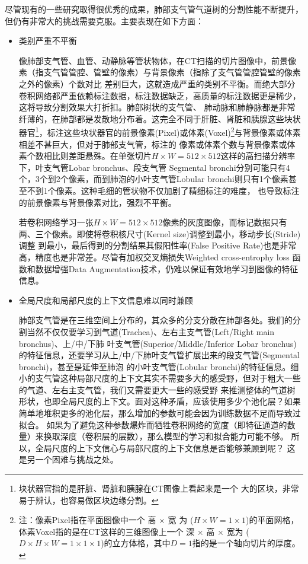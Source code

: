 尽管现有的一些研究取得很优秀的成果，肺部支气管气道树的分割性能不断提升，但仍有非常大的挑战需要克服。主要表现在如下方面：
\begin{itemize}
	\item {\heiti 类别严重不平衡}
	
	像肺部支气管、血管、动静脉等管状物体，在CT扫描的切片图像中，前景像素（指支气管管腔、管壁的像素）与背景像素（指除了支气管管腔管壁的像素之外的像素）个数对比
	差别巨大，这就造成严重的类别不平衡。而绝大部分卷积网络都严重依赖标注数据，标注数据缺乏，高质量的标注数据更是稀少，这将导致分割效果大打折扣。肺部树状的支气管、
	肺动脉和肺静脉都是非常纤薄的，在肺部都是发散地分布着。这完全不同于肝脏、肾脏和胰腺这些块状器官\footnote{块状器官指的是肝脏、肾脏和胰腺在CT图像上看起来是一个
	大的区块，非常易于辨认，也容易做区块边缘分割。}，标注这些块状器官的前景像素(Pixel)或体素(Voxel)\footnote{注：像素Pixel指在平面图像中一个 高 $\times$ 宽 为
	($H \times W = 1 \times 1$)的平面网格，体素Voxel指的是在CT这样的三维图像上一个 深 $\times$ 高 $\times$ 宽为
	($D \times H \times W = 1 \times 1 \times 1$)的立方体格，其中$D = 1$指的是一个轴向切片的厚度。}与背景像素或体素相差不甚巨大，但对于肺部支气管，标注的
	像素或体素个数与背景像素或体素个数相比则差距悬殊。在单张切片$H \times W = 512 \times 512$这样的高扫描分辨率下，叶支气管Lobar bronchus、段支气管
	Segmental bronchi分别可能只有4个，3个到2个像素，而到肺泡的小叶支气管Lobular bronchi则只有1个像素甚至不到1个像素。这种毛细的管状物不仅加剧了精细标注的难度，
	也导致标注的前景像素与背景像素对比，强烈不平衡。
	
	若卷积网络学习一张$H \times W = 512 \times 512$像素的灰度图像，而标记数据只有两、三个像素。即使将卷积核尺寸(Kernel size)调整到最小，移动步长(Stride)调整
	到最小，最后得到的分割结果其假阳性率(False Positive Rate)也是非常高，精度也是非常差。尽管有加权交叉熵损失Weighted cross-entrophy loss
	\cite{Yuri2019WeightedCrossEntrophy}函数和数据增强Data Augmentation技术，仍难以保证有效地学习到图像的特征信息。
	
	\item {\heiti 全局尺度和局部尺度的上下文信息难以同时兼顾}
	
	肺部支气管是在三维空间上分布的，其众多的分支分散在肺部各处。我们的分割当然不仅仅要学习到气道(Trachea)、左右主支气管(Left/Right main bronchus)、上/中/下肺
	叶支气管(Superior/Middle/Inferior Lobar bronchus)的特征信息，还要学习从上/中/下肺叶支气管扩展出来的段支气管(Segmental bronchi)，甚至是延伸至肺泡
	的小叶支气管(Lobular bronchi)的特征信息。细小的支气管这种局部尺度的上下文其实不需要多大的感受野，但对于粗大一些的气道、左右主支气管，我们又需要更大一些的感受野
	来推测整体的气道树形状，也即全局尺度的上下文。面对这种矛盾，应该使用多少个池化层？如果简单地堆积更多的池化层，那么增加的参数可能会因为训练数据不足而导致过拟合。
	如果为了避免这种参数爆炸而牺牲卷积网络的宽度（即特征通道的数量）来换取深度（卷积层的层数），那么模型的学习和拟合能力可能不够\cite{Qin2021TubuleSen}。
	所以，全局尺度的上下文信心与局部尺度的上下文信息是否能够兼顾到呢？ 这是另一个困难与挑战之处。
\end{itemize}


